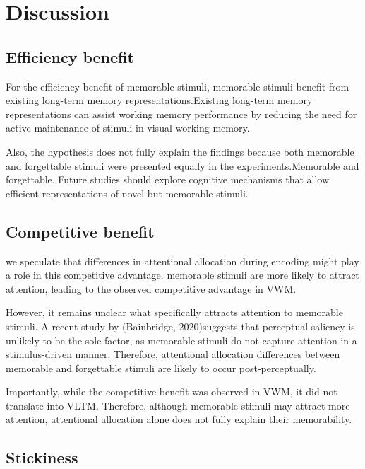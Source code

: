 \documentclass[
  man]{apa6}
\begin{document}
\hypertarget{discussion}{%
\section{Discussion}\label{discussion}}

\hypertarget{efficiency-benefit}{%
\subsection{Efficiency benefit}\label{efficiency-benefit}}

For the efficiency benefit of memorable stimuli, memorable stimuli benefit from existing long-term memory representations.Existing long-term memory representations can assist working memory performance by reducing the need for active maintenance of stimuli in visual working memory.

Also, the hypothesis does not fully explain the findings because both memorable and forgettable stimuli were presented equally in the experiments.Memorable and forgettable. Future studies should explore cognitive mechanisms that allow efficient representations of novel but memorable stimuli.

\hypertarget{competitive-benefit}{%
\subsection{Competitive benefit}\label{competitive-benefit}}

we speculate that differences in attentional allocation during encoding might play a role in this competitive advantage. memorable stimuli are more likely to attract attention, leading to the observed competitive advantage in VWM.

However, it remains unclear what specifically attracts attention to memorable stimuli. A recent study by (Bainbridge, 2020)suggests that perceptual saliency is unlikely to be the sole factor, as memorable stimuli do not capture attention in a stimulus-driven manner. Therefore, attentional allocation differences between memorable and forgettable stimuli are likely to occur post-perceptually.

Importantly, while the competitive benefit was observed in VWM, it did not translate into VLTM. Therefore, although memorable stimuli may attract more attention, attentional allocation alone does not fully explain their memorability.

\hypertarget{stickiness}{%
\subsection{Stickiness}\label{stickiness}}
\end{document}
